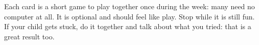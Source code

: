 \documentclass[track=junior,level=2]{kidscode}
\begin{document}

\begin{grownup}
Each card is a short game to play together once during the week: many need no computer at all.
It is optional and should feel like play. Stop while it is still fun. If your child gets stuck,
do it together and talk about what you tried: that is a great result too.
\end{grownup}
\kcweeklytoc
{}
\end{document}
